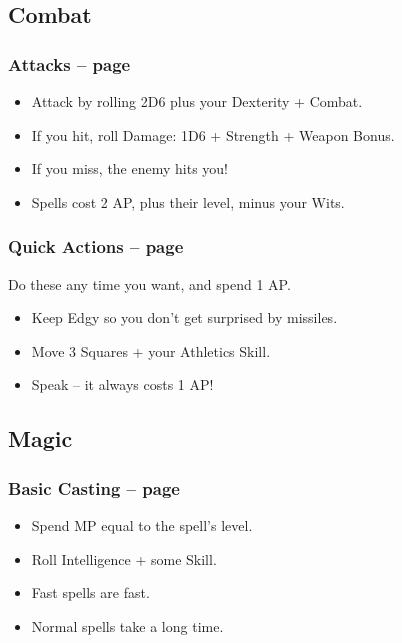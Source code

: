 \begin{multicols}{2}
\subsection{Combat}

\subsubsection{Attacks -- page \pageref{attack}}

\begin{itemize}
  \item
  Attack by rolling 2D6 plus your Dexterity + Combat.
  \item
  If you hit, roll Damage: 1D6 + Strength + Weapon Bonus.
  \item
  If you miss, the enemy hits you!
  \item
  Spells cost 2 AP, plus their level, minus your Wits.
\end{itemize}

\subsubsection{Quick Actions -- page \pageref{quickaction}}

Do these any time you want, and spend 1 AP.

\begin{itemize}

  \item
  Keep Edgy so you don't get surprised by missiles.
  \item
  Move 3 Squares + your Athletics Skill.
  \item
  Speak -- it always costs 1 AP!

\end{itemize}

\subsection{Magic}

\subsubsection{Basic Casting -- page \pageref{basiccasting}}

\begin{itemize}

  \item
  Spend MP equal to the spell's level.
  \item
  Roll Intelligence + some Skill.
  \item
  Fast spells are fast.
  \item
  Normal spells take a long time.


\end{itemize}
\end{multicols}
